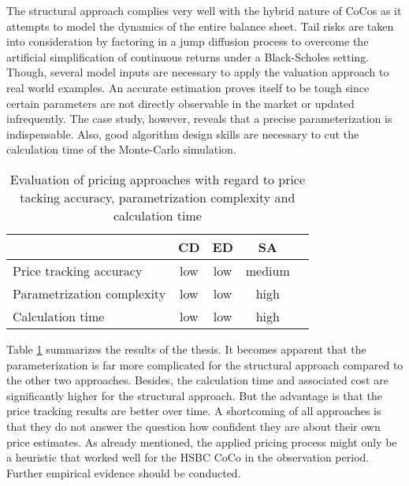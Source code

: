 The structural approach complies very well with the hybrid nature of CoCos as it attempts to model the dynamics of the entire balance sheet. Tail risks are taken into consideration by factoring in a jump diffusion process to overcome the artificial simplification of continuous returns under a Black-Scholes setting. Though, several model inputs are necessary to apply the valuation approach to real world examples. An accurate estimation proves itself to be tough since certain parameters are not directly observable in the market or updated infrequently. The case study, however, reveals that a precise parameterization is indispensable. Also, good algorithm design skills are necessary to cut the calculation time of the Monte-Carlo simulation.

\begin{table}[H]
	\setlength{\extrarowheight}{2.5pt}
	\centering
	\begin{tabular}{lcccc}
		\toprule
			 & \textbf{CD} & \textbf{ED} & \textbf{SA}\\
		\midrule
			Price tracking accuracy & \cellcolor{red!20} low & \cellcolor{red!20} low & \cellcolor{yellow!20} medium\\
			Parametrization complexity & \cellcolor{green!20} low & \cellcolor{green!20} low & \cellcolor{red!20} high\\
			Calculation time & \cellcolor{green!20} low & \cellcolor{green!20} low & \cellcolor{red!20} high\\
		\bottomrule
	\end{tabular}
	\caption[Evaluation of pricing approaches with regard to three dimensions]{Evaluation of pricing approaches with regard to price tacking accuracy, parametrization complexity and calculation time}
	\label{table:evaluationtrigger}
\end{table}

Table \ref{table:evaluationtrigger} summarizes the results of the thesis. It becomes apparent that the parameterization is far more complicated for the structural approach compared to the other two approaches. Besides, the calculation time and associated cost are significantly higher for the structural approach. But the advantage is that the price tracking results are better over time. A shortcoming of all approaches is that they do not answer the question how confident they are about their own price estimates. As already mentioned, the applied pricing process might only be a heuristic that worked well for the HSBC CoCo in the observation period. Further empirical evidence should be conducted.








